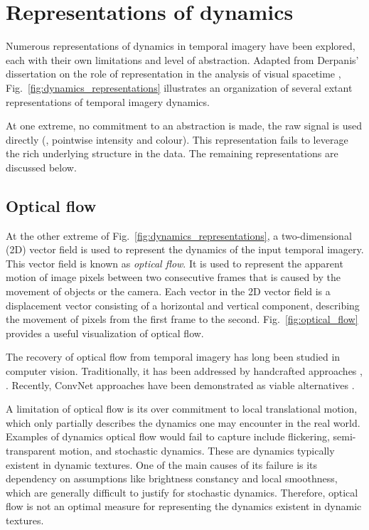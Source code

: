 \section{Representations of dynamics}

Numerous representations of dynamics in temporal imagery have been explored, each with their own limitations and level of abstraction. Adapted from Derpanis' dissertation on the role of representation in the analysis of visual spacetime \cite{derpanis2010role}, Fig.\ \ref{fig:dynamics_representations} illustrates an organization of several extant representations of temporal imagery dynamics.

At one extreme, no commitment to an abstraction is made, the raw signal is used directly (\eg, pointwise intensity and colour). This representation fails to leverage the rich underlying structure in the data. The remaining representations are discussed below.

\subsection{Optical flow}

At the other extreme of Fig.\ \ref{fig:dynamics_representations}, a two-dimensional (2D) vector field is used to represent the dynamics of the input temporal imagery. This vector field is known as \emph{optical flow}. It is used to represent the apparent motion of image pixels between two consecutive frames that is caused by the movement of objects or the camera. Each vector in the 2D vector field is a displacement vector consisting of a horizontal and vertical component, describing the movement of pixels from the first frame to the second. Fig.\ \ref{fig:optical_flow} provides a useful visualization of optical flow.

The recovery of optical flow from temporal imagery has long been studied in computer vision. Traditionally, it has been addressed by handcrafted approaches \eg, \cite{horn1981,lucas1981,revaud2015epicflow}. Recently, ConvNet approaches have been demonstrated as viable alternatives \cite{dosovitskiy2015,ilg2017,ranjan2017,yu2016}.

A limitation of optical flow is its over commitment to local translational motion, which only partially describes the dynamics one may encounter in the real world. Examples of dynamics optical flow would fail to capture include flickering, semi-transparent motion, and stochastic dynamics. These are dynamics typically existent in dynamic textures. One of the main causes of its failure is its dependency on assumptions like brightness constancy and local smoothness, which are generally difficult to justify for stochastic dynamics. Therefore, optical flow is not an optimal measure for representing the dynamics existent in dynamic textures.

